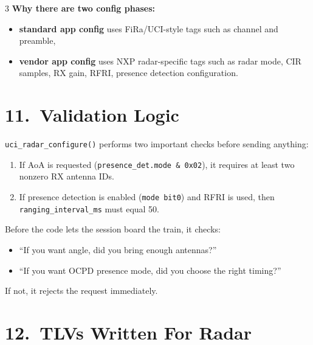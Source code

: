 \documentclass[10pt]{article}
\begin{document}
\begin{multicols*}{3}
\textbf{Why there are two config phases:}
\begin{itemize}
  \item \textbf{standard app config} uses FiRa/UCI-style tags such as channel and preamble,
  \item \textbf{vendor app config} uses NXP radar-specific tags such as radar mode, CIR samples, RX gain, RFRI, presence detection configuration.
\end{itemize}

\section*{11.\ Validation Logic}

\texttt{uci\_radar\_configure()} performs two important checks before sending anything:

\begin{enumerate}
  \item If AoA is requested (\texttt{presence\_det.mode \& 0x02}), it requires at least two nonzero RX antenna IDs.
  \item If presence detection is enabled (\texttt{mode bit0}) and RFRI is used, then \texttt{ranging\_interval\_ms} must equal 50.
\end{enumerate}

\begin{tcolorbox}[analogybox={Analogy --- Ticket Checker}]
Before the code lets the session board the train, it checks:
\begin{itemize}
  \item ``If you want angle, did you bring enough antennas?''
  \item ``If you want OCPD presence mode, did you choose the right timing?''
\end{itemize}
If not, it rejects the request immediately.
\end{tcolorbox}

\section*{12.\ TLVs Written For Radar}


\end{multicols*}
\end{document}
